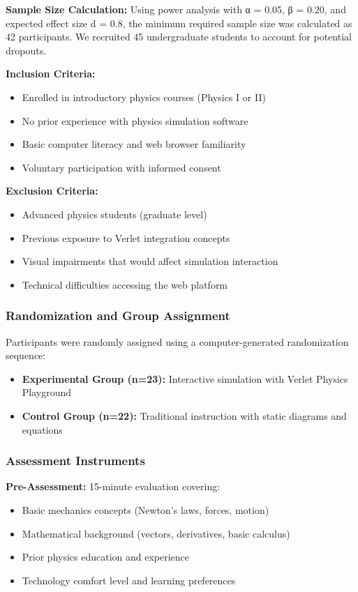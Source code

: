 \documentclass[12pt,journal,onecolumn]{IEEEtran}
\begin{document}
\textbf{Sample Size Calculation:} Using power analysis with α = 0.05, β = 0.20, and expected effect size d = 0.8, the minimum required sample size was calculated as 42 participants. We recruited 45 undergraduate students to account for potential dropouts.

\textbf{Inclusion Criteria:}
\begin{itemize}
\item Enrolled in introductory physics courses (Physics I or II)
\item No prior experience with physics simulation software
\item Basic computer literacy and web browser familiarity
\item Voluntary participation with informed consent
\end{itemize}

\textbf{Exclusion Criteria:}
\begin{itemize}
\item Advanced physics students (graduate level)
\item Previous exposure to Verlet integration concepts
\item Visual impairments that would affect simulation interaction
\item Technical difficulties accessing the web platform
\end{itemize}

\subsubsection{Randomization and Group Assignment}

Participants were randomly assigned using a computer-generated randomization sequence:
\begin{itemize}
\item \textbf{Experimental Group (n=23):} Interactive simulation with Verlet Physics Playground
\item \textbf{Control Group (n=22):} Traditional instruction with static diagrams and equations
\end{itemize}

\subsubsection{Assessment Instruments}

\textbf{Pre-Assessment:} 15-minute evaluation covering:
\begin{itemize}
\item Basic mechanics concepts (Newton's laws, forces, motion)
\item Mathematical background (vectors, derivatives, basic calculus)
\item Prior physics education and experience
\item Technology comfort level and learning preferences
\end{itemize}
\end{document}
